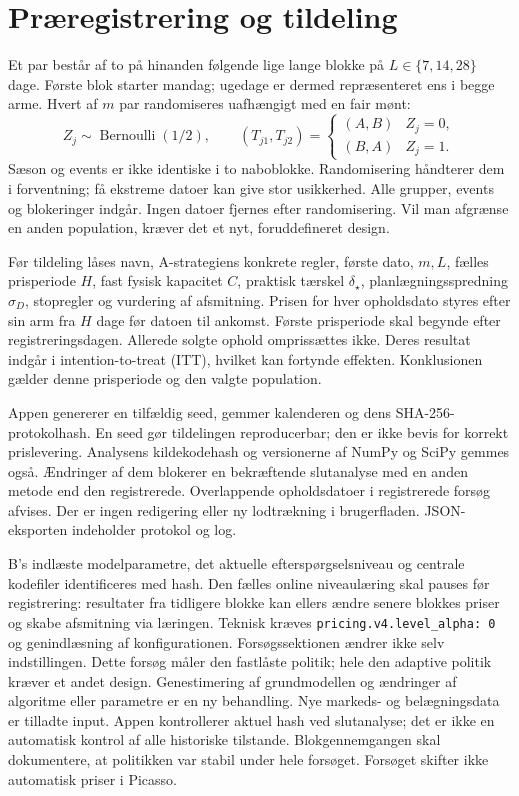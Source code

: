\documentclass[11pt,a4paper]{article}
\begin{document}
\section{Præregistrering og tildeling}
Et par består af to på hinanden følgende lige lange blokke på $L\in\{7,14,28\}$
dage. Første blok starter mandag; ugedage er dermed repræsenteret ens i begge
arme. Hvert af $m$ par randomiseres uafhængigt med en fair mønt:
\begin{equation}
 Z_j\sim\operatorname{Bernoulli}(1/2),\qquad
 (T_{j1},T_{j2})=\begin{cases}(A,B)&Z_j=0,\\(B,A)&Z_j=1.\end{cases}
\end{equation}
Sæson og events er ikke identiske i to naboblokke. Randomisering håndterer dem i
forventning; få ekstreme datoer kan give stor usikkerhed. Alle grupper, events og
blokeringer indgår. Ingen datoer fjernes efter randomisering. Vil man afgrænse
en anden population, kræver det et nyt, foruddefineret design.

Før tildeling låses navn, A-strategiens konkrete regler, første dato, $m,L$,
fælles prisperiode $H$, fast fysisk kapacitet $C$, praktisk tærskel $\delta_\star$,
planlægningsspredning $\sigma_D$, stopregler og vurdering af afsmitning. Prisen
for hver opholdsdato styres efter sin arm fra $H$ dage før datoen til ankomst.
Første prisperiode skal begynde efter registreringsdagen. Allerede solgte ophold
omprissættes ikke. Deres resultat indgår i intention-to-treat (ITT), hvilket kan
fortynde effekten. Konklusionen gælder denne prisperiode og den valgte population.

Appen genererer en tilfældig seed, gemmer kalenderen og dens SHA-256-protokolhash.
En seed gør tildelingen reproducerbar; den er ikke bevis for korrekt prislevering.
Analysens kildekodehash og versionerne af NumPy og SciPy gemmes også. Ændringer
af dem blokerer en bekræftende slutanalyse med en anden metode end den registrerede.
Overlappende opholdsdatoer i registrerede forsøg afvises. Der er ingen redigering
eller ny lodtrækning i brugerfladen. JSON-eksporten indeholder protokol og log.

B's indlæste modelparametre, det aktuelle efterspørgselsniveau og centrale
kodefiler identificeres med hash. Den fælles online niveaulæring skal pauses
før registrering: resultater fra tidligere blokke kan ellers ændre senere
blokkes priser og skabe afsmitning via læringen. Teknisk kræves
\texttt{pricing.v4.level\_alpha: 0} og genindlæsning af konfigurationen.
Forsøgssektionen ændrer ikke selv indstillingen. Dette forsøg måler den
fastlåste politik; hele den adaptive politik kræver et andet design.
Genestimering af grundmodellen og ændringer af algoritme eller parametre er
en ny behandling. Nye markeds- og belægningsdata er tilladte input.
Appen kontrollerer aktuel hash ved slutanalyse; det er ikke en automatisk kontrol
af alle historiske tilstande. Blokgennemgangen skal dokumentere, at politikken
var stabil under hele forsøget. Forsøget skifter ikke automatisk priser i Picasso.
\end{document}
